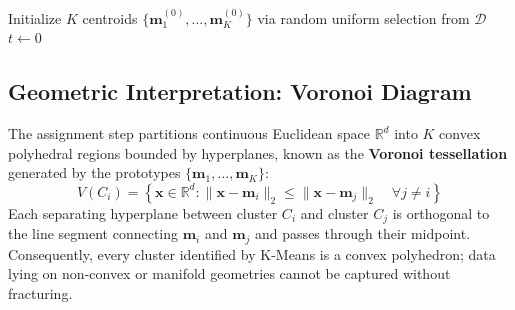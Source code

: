\begin{algorithm}[htbp]
\SetAlgoLined
{}
Initialize $K$ centroids $\{\mathbf{m}_1^{(0)}, \dots, \mathbf{m}_K^{(0)}\}$ via random uniform selection from $\mathcal{D}$\;
$t \leftarrow 0$\;
\caption{Standard K-Means algorithm (Lloyd).}
\label{alg:dm-kmeans-lloyd-en}
\end{algorithm}

\subsection{Geometric Interpretation: Voronoi Diagram}

The assignment step partitions continuous Euclidean space $\mathbb{R}^d$ into $K$ convex polyhedral regions bounded by hyperplanes, known as the \textbf{Voronoi tessellation} generated by the prototypes $\{\mathbf{m}_1, \dots, \mathbf{m}_K\}$:
\begin{equation}
    V(C_i) = \left\{ \mathbf{x} \in \mathbb{R}^d : \|\mathbf{x} - \mathbf{m}_i\|_2 \le \|\mathbf{x} - \mathbf{m}_j\|_2 \quad \forall j \ne i \right\}
\end{equation}
Each separating hyperplane between cluster $C_i$ and cluster $C_j$ is orthogonal to the line segment connecting $\mathbf{m}_i$ and $\mathbf{m}_j$ and passes through their midpoint. Consequently, every cluster identified by K-Means is a convex polyhedron; data lying on non-convex or manifold geometries cannot be captured without fracturing.

